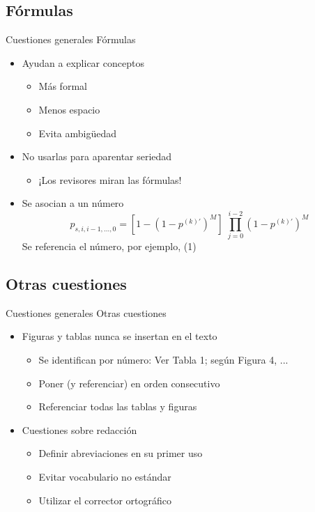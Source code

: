 \documentclass{beamer}
\begin{document}
\subsection{Fórmulas}
\begin{frame}{Cuestiones generales} {Fórmulas}
	\begin{itemize}
		\item Ayudan a explicar conceptos
			\begin{itemize}
			\item Más formal
			\item Menos espacio
			\item Evita ambigüedad
			\end{itemize}
		\item No usarlas para aparentar seriedad
			\begin{itemize}
			\item ¡Los revisores miran las fórmulas!
			\end{itemize}
		\item Se asocian a un número
			\begin{equation}
			p_{s,i,i-1, ..., 0} = \left[1-(1-p^{(k)'})^M\right] \; \prod_{j=0}^{i-2} \left(1-p^{(k)'}\right)^M%
			\end{equation}
			Se referencia el número, por ejemplo, (1)
	\end{itemize}
\end{frame}

\subsection{Otras cuestiones}
\begin{frame}{Cuestiones generales} {Otras cuestiones}
	\begin{itemize}
		\item Figuras y tablas \alert{nunca} se insertan en el texto
			\begin{itemize}
			\item Se identifican por número: Ver Tabla 1; según Figura 4, ...
			\item Poner (y referenciar) en orden consecutivo
			\item Referenciar \alert{todas} las tablas y figuras
			\end{itemize}
			\item Cuestiones sobre redacción
			\begin{itemize}
			\item Definir abreviaciones en su primer uso
			\item Evitar vocabulario no estándar
			\item Utilizar el corrector ortográfico
			\end{itemize}
	\end{itemize}
\end{frame}
\end{document}
